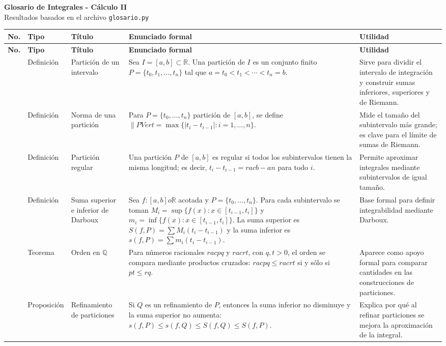 \documentclass[10pt,landscape]{article}
\begin{document}
\begin{center}
{\LARGE\bfseries Glosario de Integrales - Cálculo II}\\[3mm]
{\large Resultados basados en el archivo \texttt{glosario.py}}
\end{center}

\small
\begin{longtable}{|>{\centering\arraybackslash}p{0.7cm}|>{\centering\arraybackslash}p{2.4cm}|p{4.2cm}|p{11.8cm}|p{7.2cm}|}
\hline
\rowcolor{azulmac!18}
\textbf{No.} & \textbf{Tipo} & \textbf{Título} & \textbf{Enunciado formal} & \textbf{Utilidad} \\
\hline
\endfirsthead
\hline
\rowcolor{azulmac!18}
\textbf{No.} & \textbf{Tipo} & \textbf{Título} & \textbf{Enunciado formal} & \textbf{Utilidad} \\
\hline
\endhead
1 & Definición & Partición de un intervalo & Sea $I=[a,b]\subset \mathbb{R}$. Una partición de $I$ es un conjunto finito $P=\{t_0,t_1,\ldots,t_n\}$ tal que $a=t_0<t_1<\cdots<t_n=b$. & Sirve para dividir el intervalo de integración y construir sumas inferiores, superiores y de Riemann. \\ \hline
2 & Definición & Norma de una partición & Para $P=\{t_0,\ldots,t_n\}$ partición de $[a,b]$, se define $\lVert P
Vert=\max\{|t_i-t_{i-1}|:i=1,\ldots,n\}$. & Mide el tamaño del subintervalo más grande; es clave para el límite de sumas de Riemann. \\ \hline
3 & Definición & Partición regular & Una partición $P$ de $[a,b]$ es regular si todos los subintervalos tienen la misma longitud; es decir, $t_i-t_{i-1}=rac{b-a}{n}$ para todo $i$. & Permite aproximar integrales mediante subintervalos de igual tamaño. \\ \hline
4 & Definición & Suma superior e inferior de Darboux & Sea $f:[a,b]	o\mathbb{R}$ acotada y $P=\{t_0,\ldots,t_n\}$. Para cada subintervalo se toman $M_i=\sup\{f(x):x\in[t_{i-1},t_i]\}$ y $m_i=\inf\{f(x):x\in[t_{i-1},t_i]\}$. La suma superior es $S(f,P)=\sum M_i(t_i-t_{i-1})$ y la suma inferior es $s(f,P)=\sum m_i(t_i-t_{i-1})$. & Base formal para definir integrabilidad mediante Darboux. \\ \hline
5 & Teorema & Orden en $\mathbb{Q}$ & Para números racionales $rac{p}{q}$ y $rac{r}{t}$, con $q,t>0$, el orden se compara mediante productos cruzados: $rac{p}{q}\leqrac{r}{t}$ si y sólo si $pt\leq rq$. & Aparece como apoyo formal para comparar cantidades en las construcciones de particiones. \\ \hline
6 & Proposición & Refinamiento de particiones & Si $Q$ es un refinamiento de $P$, entonces la suma inferior no disminuye y la suma superior no aumenta: $s(f,P)\leq s(f,Q)\leq S(f,Q)\leq S(f,P)$. & Explica por qué al refinar particiones se mejora la aproximación de la integral. \\ \hline

\end{longtable}
\end{document}
